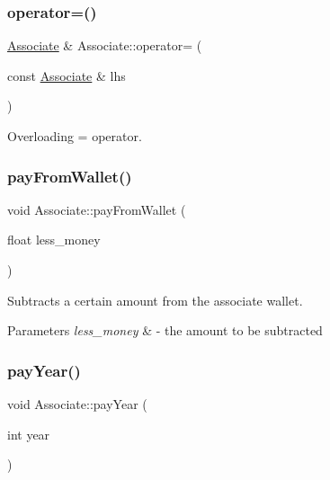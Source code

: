 \mbox{\label{classAssociate_a3b9d47c7e6dafad03a4b33f7eebec177}} 
\subsubsection{\texorpdfstring{operator=()}{operator=()}}
{\footnotesize\ttfamily \mbox{\hyperlink{classAssociate}{Associate}} \& Associate\+::operator= (\begin{DoxyParamCaption}\item[{const \mbox{\hyperlink{classAssociate}{Associate}} \&}]{lhs }\end{DoxyParamCaption})}



Overloading = operator. 

\mbox{\label{classAssociate_a81f6e7e09ce00a9bf2a805d47d542b90}} 
\subsubsection{\texorpdfstring{pay\+From\+Wallet()}{payFromWallet()}}
{\footnotesize\ttfamily void Associate\+::pay\+From\+Wallet (\begin{DoxyParamCaption}\item[{float}]{less\+\_\+money }\end{DoxyParamCaption})}



Subtracts a certain amount from the associate wallet. 


\begin{DoxyParams}{Parameters}
{\em less\+\_\+money} & -\/ the amount to be subtracted \\
\hline
\end{DoxyParams}
\mbox{\label{classAssociate_ac5d76c7a552e5ad9149fc968511532bf}} 
\subsubsection{\texorpdfstring{pay\+Year()}{payYear()}}
{\footnotesize\ttfamily void Associate\+::pay\+Year (\begin{DoxyParamCaption}\item[{int}]{year }\end{DoxyParamCaption})}



